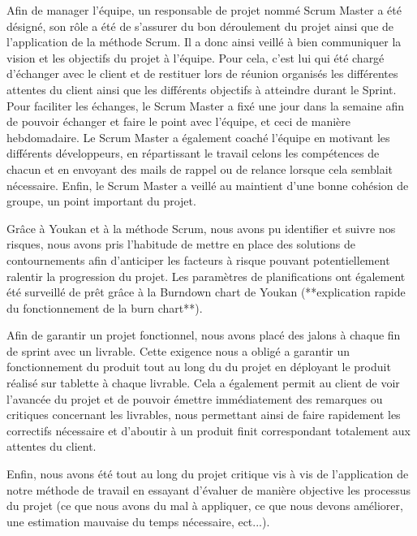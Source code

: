 Afin de manager l'équipe, un responsable de projet nommé Scrum Master a été désigné, son rôle a été de s'assurer du bon déroulement du projet ainsi que de l'application de la méthode Scrum. Il a donc ainsi veillé à bien communiquer la vision et les objectifs du projet à l'équipe. Pour cela, c'est lui qui été chargé d'échanger avec le client et de restituer lors de réunion organisés les différentes attentes du client ainsi que les différents objectifs à atteindre durant le Sprint. Pour faciliter les échanges, le Scrum Master a fixé une jour dans la semaine afin de pouvoir échanger et faire le point avec l'équipe, et ceci de manière hebdomadaire. Le Scrum Master a également coaché l'équipe en motivant les différents développeurs, en répartissant le travail celons les compétences de chacun et en envoyant des mails de rappel ou de relance lorsque cela semblait nécessaire. Enfin, le Scrum Master a veillé au maintient d'une bonne cohésion de groupe, un point important du projet.

Grâce à Youkan et à la méthode Scrum, nous avons pu identifier et suivre nos risques, nous avons pris l'habitude de mettre en place des solutions de contournements afin d'anticiper les facteurs à risque pouvant potentiellement ralentir la progression du projet.
Les paramètres de planifications ont également été surveillé de prêt grâce à la Burndown chart de Youkan (**explication rapide du fonctionnement de la burn chart**).

Afin de garantir un projet fonctionnel, nous avons placé des jalons à chaque fin de sprint avec un livrable. Cette exigence nous a obligé a garantir un fonctionnement du produit tout au long du du projet en déployant le produit réalisé sur tablette à chaque livrable. Cela a également permit au client de voir l'avancée du projet et de pouvoir émettre immédiatement des remarques ou critiques concernant les livrables, nous permettant ainsi de faire rapidement les correctifs nécessaire et d'aboutir à un produit finit correspondant totalement aux attentes du client.  

Enfin, nous avons été tout au long du projet critique vis à vis de l'application de notre méthode de travail en essayant d'évaluer  de manière objective les processus du projet (ce que nous avons du mal à appliquer, ce que nous devons améliorer, une estimation mauvaise du temps nécessaire, ect...). 



